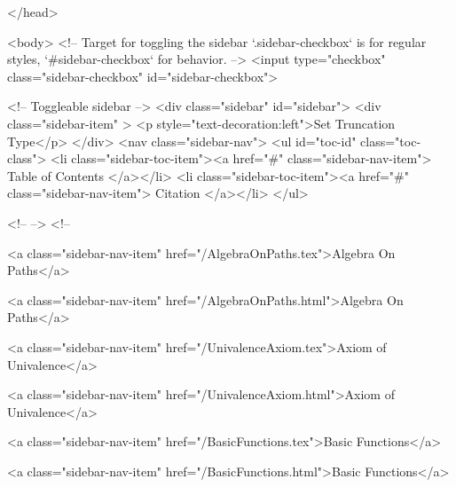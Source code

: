   
</head>




  <body>
    <!-- Target for toggling the sidebar `.sidebar-checkbox` is for regular
     styles, `#sidebar-checkbox` for behavior. -->
<input type="checkbox" class="sidebar-checkbox" id="sidebar-checkbox">

<!-- Toggleable sidebar -->
<div class="sidebar" id="sidebar">
  <div class="sidebar-item" >
    <p style="text-decoration:left">Set Truncation Type</p>
  </div>
  <nav class="sidebar-nav">
    <ul id="toc-id" class="toc-class">
  <li class="sidebar-toc-item"><a href="#" class="sidebar-nav-item"> Table of Contents </a></li>
  <li class="sidebar-toc-item"><a href="#" class="sidebar-nav-item"> Citation </a></li>
</ul>


    <!--  -->
    <!-- 
      
    
      
    
      
    
      
        
      
    
      
        
          <a class="sidebar-nav-item" href="/AlgebraOnPaths.tex">Algebra On Paths</a>
        
      
    
      
        
          <a class="sidebar-nav-item" href="/AlgebraOnPaths.html">Algebra On Paths</a>
        
      
    
      
        
          <a class="sidebar-nav-item" href="/UnivalenceAxiom.tex">Axiom of Univalence</a>
        
      
    
      
        
          <a class="sidebar-nav-item" href="/UnivalenceAxiom.html">Axiom of Univalence</a>
        
      
    
      
        
          <a class="sidebar-nav-item" href="/BasicFunctions.tex">Basic Functions</a>
        
      
    
      
        
          <a class="sidebar-nav-item" href="/BasicFunctions.html">Basic Functions</a>
        
      
    
      
        
